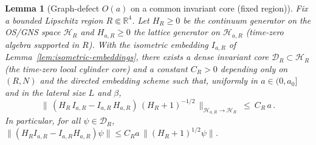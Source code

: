 \documentclass[11pt]{amsart}
\theoremstyle{plain}
\newtheorem{lemma}[theorem]{Lemma}
\theoremstyle{definition}
\theoremstyle{remark}
\begin{document}
\begin{lemma}[Graph-defect $O(a)$ on a common invariant core (fixed region)]\label{lem:graph-defect-core}
Fix a bounded Lipschitz region $R\Subset \mathbb R^4$. Let $H_R\ge 0$ be the continuum generator on the OS/GNS space $\mathcal H_R$ and $H_{a,R}\ge 0$ the lattice generator on $\mathcal H_{a,R}$ (time-zero algebra supported in $R$). With the isometric embedding $I_{a,R}$ of Lemma~\ref{lem:isometric-embeddings}, there exists a dense invariant core $\mathcal D_R\subset\mathcal H_R$ (the time-zero local cylinder core) and a constant $C_R>0$ depending only on $(R,N)$ and the directed embedding scheme such that, uniformly in $a\in(0,a_0]$ and in the lateral size $L$ and $\beta$,
\[
  \big\|\,(H_R\,I_{a,R} - I_{a,R}\,H_{a,R})\,(H_R+1)^{-1/2}\,\big\|_{\mathcal H_{a,R}\to\mathcal H_R}
  \ \le\ C_R\, a\,.
\]
In particular, for all $\psi\in\mathcal D_R$, $\|(H_R I_{a,R} - I_{a,R} H_{a,R})\psi\|\le C_R a\,\|(H_R+1)^{1/2}\psi\|$.
\end{lemma}
\end{document}
